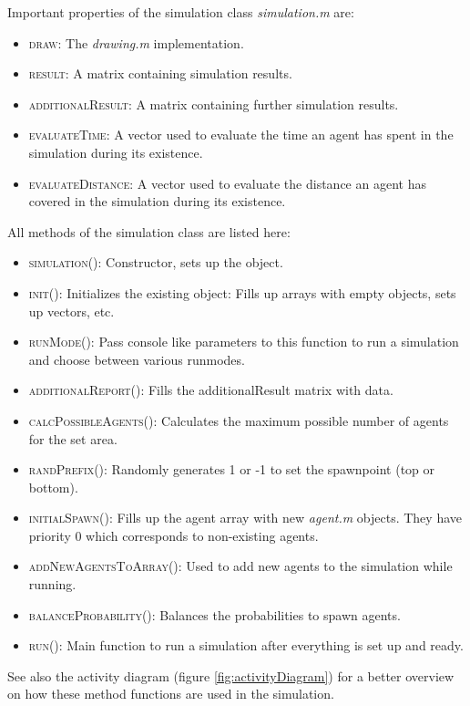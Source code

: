 \noi Important properties of the simulation class \textit{simulation.m} are:
\begin{itemize}
\item \textsc{draw}: The \textit{drawing.m} implementation.
\item \textsc{result}: A matrix containing simulation results.
\item \textsc{additionalResult}: A matrix containing further simulation results.
\item \textsc{evaluateTime}: A vector used to evaluate the time an agent has spent in the simulation during its existence. %
\item \textsc{evaluateDistance}: A vector used to evaluate the distance an agent has covered in the simulation during its existence. %
\end{itemize}
\noi All methods of the simulation class are listed here:
\begin{itemize}
\item \textsc{simulation()}: Constructor, sets up the object.
\item \textsc{init()}: Initializes the existing object: Fills up arrays with empty objects, sets up vectors, etc.
\item \textsc{runMode()}: Pass console like parameters to this function to run a simulation and choose between various runmodes.
\item \textsc{additionalReport()}: Fills the additionalResult matrix with data.
\item \textsc{calcPossibleAgents()}: Calculates the maximum possible number of agents for the set area. 
\item \textsc{randPrefix()}: Randomly generates 1 or -1 to set the spawnpoint (top or bottom).
\item \textsc{initialSpawn()}: Fills up the agent array with new \textit{agent.m} objects. They have priority 0 which corresponds to non-existing agents.
\item \textsc{addNewAgentsToArray()}: Used to add new agents to the simulation while running.
\item \textsc{balanceProbability()}: Balances the probabilities to spawn agents.
\item \textsc{run()}: Main function to run a simulation after everything is set up and ready.
\end{itemize}
\noi See also the activity diagram (figure \ref{fig:activityDiagram}) for a better overview on how these method functions are used in the simulation.\\

